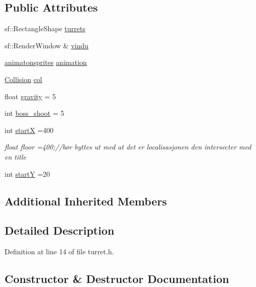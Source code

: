 \subsection*{Public Attributes}
\begin{DoxyCompactItemize}
\item 
sf\+::\+Rectangle\+Shape \hyperlink{classturret_a0c205e4ea097f7dc2b0da90196e75d3c}{turrets}
\item 
sf\+::\+Render\+Window \& \hyperlink{classturret_a226e3153f72a293f9f62e1e1dea16739}{vindu}
\item 
\hyperlink{classanimatonsprites}{animatonsprites} \hyperlink{classturret_ab7b13d0d01ee962c127ef5ca2e5b600a}{animation}
\item 
\hyperlink{class_collision}{Collision} \hyperlink{classturret_a7a0448d6a1fdbe3d817dfad07a77fee6}{col}
\item 
float \hyperlink{classturret_a816c6ed6f6d915854f94f177b9810619}{gravity} = 5
\item 
int \hyperlink{classturret_abd8cba4229f37940856dc62d9f3a62eb}{boss\+\_\+shoot} = 5
\item 
int \hyperlink{classturret_a1ca28235d997ed88d28996d83e400061}{startX} =400
\begin{DoxyCompactList}\small\item\em float floor =400;//bør byttes ut med at det er localisasjonen den intersecter med en title \end{DoxyCompactList}\item 
int \hyperlink{classturret_a1c6f133716195eb48d8e9a9b0f65bae2}{startY} =20
\end{DoxyCompactItemize}
\subsection*{Additional Inherited Members}


\subsection{Detailed Description}


Definition at line 14 of file turret.\+h.



\subsection{Constructor \& Destructor Documentation}
\hypertarget{classturret_a823a5097ec87437c889ea7bf5878dd12}{}\label{classturret_a823a5097ec87437c889ea7bf5878dd12} 
